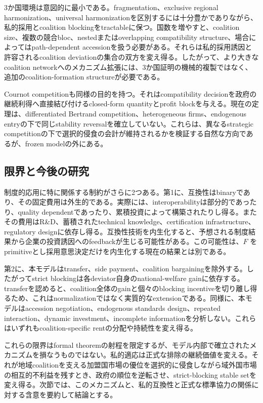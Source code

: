 3か国環境は意図的に最小である。fragmentation、exclusive regional harmonization、universal harmonizationを区別するには十分豊かでありながら、私的採用とcoalition blockingをtractableに保つ。国数を増やすと、coalition size、複数の競合bloc、nestedまたはoverlapping compatibility structure、場合によってはpath-dependent accessionを扱う必要がある。それらは私的採用誘因と許容されるcoalition deviationの集合の双方を変え得る。したがって、より大きなcoalition networkへのメカニズム拡張には、3か国証明の機械的複製ではなく、追加のcoalition-formation structureが必要である。

Cournot competitionも同様の目的を持つ。それはcompatibility decisionを政府の継続利得へ直接結び付けるclosed-form quantityとprofit blockを与える。現在の定理は、differentiated Bertrand competition、heterogeneous firms、endogenous entryの下で同じstability reversalを確立していない。これらは、異なるstrategic competitionの下で選択的侵食の会計が維持されるかを検証する自然な方向であるが、frozen modelの外にある。

\subsection{限界と今後の研究}
\label{subsec:discussion-limitations}

制度的応用に特に関係する制約がさらに2つある。第1に、互換性はbinaryであり、その固定費用は外生的である。実際には、interoperabilityは部分的であったり、quality dependentであったり、累積投資によって構築されたりし得る。またその費用はR\&D、蓄積されたtechnical knowledge、certification infrastructure、regulatory designに依存し得る。互換性技術を内生化すると、予想される制度結果から企業の投資誘因へのfeedbackが生じる可能性がある。この可能性は、$F$ をprimitiveとし採用意思決定だけを内生化する現在の結果とは別である。

第2に、本モデルはtransfer、side payment、coalition bargainingを除外する。したがってstrict blockingは各deviator自身のnational-welfare gainに依存する。transferを認めると、coalition全体のgainと個々のblocking incentiveを切り離し得るため、これはnormalizationではなく実質的なextensionである。同様に、本モデルはaccession negotiation、endogenous standards design、repeated interaction、dynamic investment、incomplete informationを分析しない。これらはいずれもcoalition-specific rentの分配や持続性を変え得る。

これらの限界はformal theoremの射程を限定するが、モデル内部で確立されたメカニズムを損なうものではない。私的適応は正式な排除の継続価値を変える。それが地域coalitionを支える加盟国市場の優位を選択的に侵食しながら域外国市場の相互的不利益を残すとき、政府の順位を逆転させ、strict-blocking stable setを変え得る。次節では、このメカニズムと、私的互換性と正式な標準協力の関係に対する含意を要約して結論とする。
